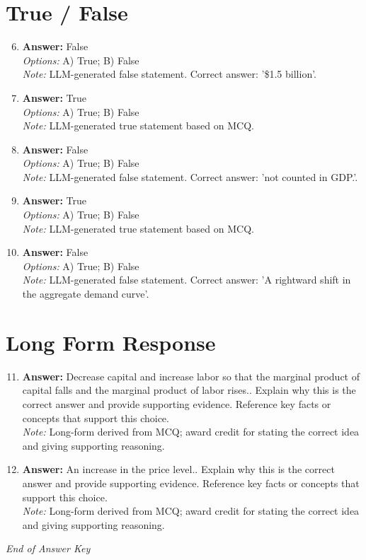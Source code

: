 \documentclass[12pt]{article}
\begin{document}
\section*{True / False}
\begin{enumerate}[label=\arabic*.]
\setcounter{enumi}{5}
\item \textbf{Answer:} False
\\ \textit{Options:} A) True; B) False
\\ \textit{Note:} LLM-generated false statement. Correct answer: '\$1.5 billion'.
\item \textbf{Answer:} True
\\ \textit{Options:} A) True; B) False
\\ \textit{Note:} LLM-generated true statement based on MCQ.
\item \textbf{Answer:} False
\\ \textit{Options:} A) True; B) False
\\ \textit{Note:} LLM-generated false statement. Correct answer: 'not counted in GDP.'.
\item \textbf{Answer:} True
\\ \textit{Options:} A) True; B) False
\\ \textit{Note:} LLM-generated true statement based on MCQ.
\item \textbf{Answer:} False
\\ \textit{Options:} A) True; B) False
\\ \textit{Note:} LLM-generated false statement. Correct answer: 'A rightward shift in the aggregate demand curve'.
\end{enumerate}

\section*{Long Form Response}
\begin{enumerate}[label=\arabic*.]
\setcounter{enumi}{10}
\item \textbf{Answer:} Decrease capital and increase labor so that the marginal product of capital falls and the marginal product of labor rises.. Explain why this is the correct answer and provide supporting evidence. Reference key facts or concepts that support this choice.
\\ \textit{Note:} Long-form derived from MCQ; award credit for stating the correct idea and giving supporting reasoning.
\item \textbf{Answer:} An increase in the price level.. Explain why this is the correct answer and provide supporting evidence. Reference key facts or concepts that support this choice.
\\ \textit{Note:} Long-form derived from MCQ; award credit for stating the correct idea and giving supporting reasoning.
\end{enumerate}

\vfill
\noindent\textit{End of Answer Key}
\end{document}
